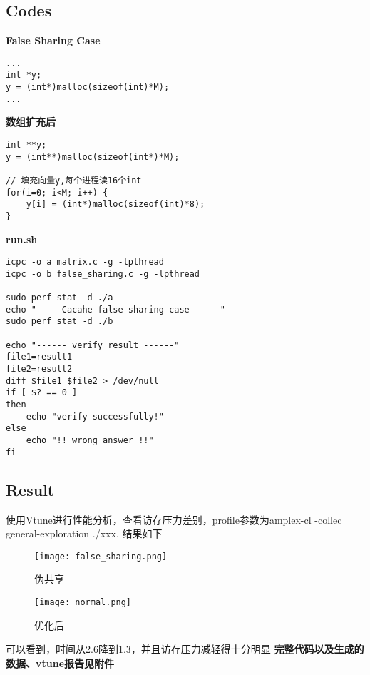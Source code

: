 \documentclass{article}
\begin{document}
\subsection{Codes}
\textbf{False Sharing Case}
\begin{lstlisting}
...
int *y;
y = (int*)malloc(sizeof(int)*M);
...
\end{lstlisting}

\textbf{数组扩充后}
\begin{lstlisting}
int **y;
y = (int**)malloc(sizeof(int*)*M);

// 填充向量y,每个进程读16个int
for(i=0; i<M; i++) {
    y[i] = (int*)malloc(sizeof(int)*8);
}
\end{lstlisting}

\textbf{run.sh}
\begin{lstlisting}
icpc -o a matrix.c -g -lpthread
icpc -o b false_sharing.c -g -lpthread

sudo perf stat -d ./a
echo "---- Cacahe false sharing case -----"
sudo perf stat -d ./b

echo "------ verify result ------"
file1=result1
file2=result2
diff $file1 $file2 > /dev/null
if [ $? == 0 ]
then
    echo "verify successfully!"
else
    echo "!! wrong answer !!"
fi
\end{lstlisting}


\subsection{Result}
使用Vtune进行性能分析，查看访存压力差别，profile参数为amplex-cl 
-collec general-exploration ./xxx,
结果如下

\begin{figure}[htpb]
    \centering
    \texttt{[image: false\_sharing.png]}
    \caption{伪共享}
\end{figure}

\begin{figure}[htpb]
    \centering
    \texttt{[image: normal.png]}
    \caption{优化后}
\end{figure}
可以看到，时间从2.6降到1.3，并且访存压力减轻得十分明显\newline
\textbf{完整代码以及生成的数据、vtune报告见附件}
\end{document}
